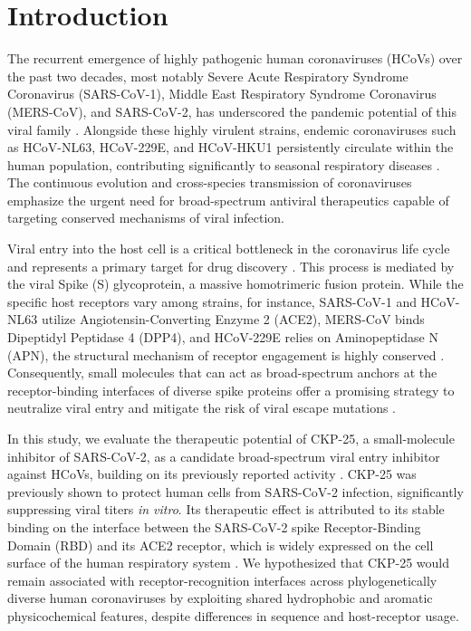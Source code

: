 \documentclass[pharmaceuticals,article,submit,pdftex,moreauthors]{Definitions/mdpi}
\begin{document}
\section{Introduction}
The recurrent emergence of highly pathogenic human coronaviruses (HCoVs) over the past two decades, most notably Severe Acute Respiratory Syndrome Coronavirus (SARS-CoV-1), Middle East Respiratory Syndrome Coronavirus (MERS-CoV), and SARS-CoV-2, has underscored the pandemic potential of this viral family \cite{cui2019origin, hu2021characteristics}. Alongside these highly virulent strains, endemic coronaviruses such as HCoV-NL63, HCoV-229E, and HCoV-HKU1 persistently circulate within the human population, contributing significantly to seasonal respiratory diseases \cite{su2016epidemiology, wilson2024global}. The continuous evolution and cross-species transmission of coronaviruses emphasize the urgent need for broad-spectrum antiviral therapeutics capable of targeting conserved mechanisms of viral infection.

Viral entry into the host cell is a critical bottleneck in the coronavirus life cycle and represents a primary target for drug discovery \cite{bosch2003severe}. This process is mediated by the viral Spike (S) glycoprotein, a massive homotrimeric fusion protein. While the specific host receptors vary among strains, for instance, SARS-CoV-1 and HCoV-NL63 utilize Angiotensin-Converting Enzyme 2 (ACE2), MERS-CoV binds Dipeptidyl Peptidase 4 (DPP4), and HCoV-229E relies on Aminopeptidase N (APN), the structural mechanism of receptor engagement is highly conserved \cite{li2016structure, walls2020structure, mahdi2025receptor}. Consequently, small molecules that can act as broad-spectrum anchors at the receptor-binding interfaces of diverse spike proteins offer a promising strategy to neutralize viral entry and mitigate the risk of viral escape mutations \cite{prajapat2020drug, lyles2025entry}.

In this study, we evaluate the therapeutic potential of CKP-25, a small-molecule inhibitor of SARS-CoV-2, as a candidate broad-spectrum viral entry inhibitor against HCoVs, building on its previously reported activity \cite{gkekas2024ai}. CKP-25 was previously shown to protect human cells from SARS-CoV-2 infection, significantly suppressing viral titers \textit{in vitro}. Its therapeutic effect is attributed to its stable binding on the interface between the SARS-CoV-2 spike Receptor-Binding Domain (RBD) and its ACE2 receptor, which is widely expressed on the cell surface of the human respiratory system \cite{zhao2020virus}. We hypothesized that CKP-25 would remain associated with receptor-recognition interfaces across phylogenetically diverse human coronaviruses by exploiting shared hydrophobic and aromatic physicochemical features, despite differences in sequence and host-receptor usage.
\end{document}
